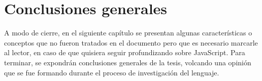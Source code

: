 \chapter{Conclusiones generales}

A modo de cierre, en el siguiente capítulo se presentan algunas características o conceptos que no fueron tratados en el documento pero que es necesario marcarle al lector, en caso de que quisiera seguir profundizando sobre JavaScript. Para terminar, se expondrán conclusiones generales de la tesis, volcando una opinión que se fue formando durante el proceso de investigación del lenguaje. 


